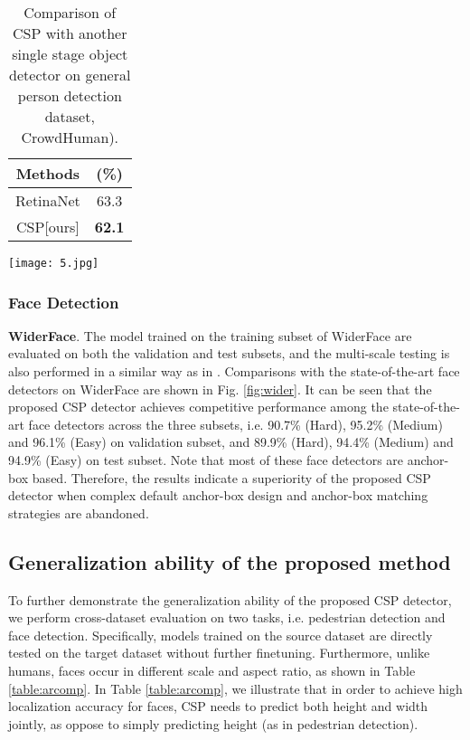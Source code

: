 \documentclass[review]{elsarticle}
\begin{document}
\begin{table}
\begin{center}
\begin{tabular}{c|c}
\hline
Methods & {(\%)}  \\
\hline
\hline
RetinaNet\cite{lin2017focal} & 63.3 \\
\hline
CSP[ours] & \textbf{62.1} \\
\hline
\end{tabular}
\end{center}
\caption{Comparison of CSP with another single stage object detector on general person detection dataset, CrowdHuman).}
\label{table:crowdhuman}
\end{table}

\begin{figure*}[t]
\begin{center}
\texttt{[image: 5.jpg]}
\end{center}
   \caption{Precision-recall curves on WIDER FACE validation and testing subsets.}
\label{fig:wider}
\end{figure*}

\subsubsection{Face Detection}
\textbf{WiderFace}.
The model trained on the training subset of WiderFace are evaluated on both the validation and test subsets, and the multi-scale testing is also performed in a similar way as in \cite{Tang_2018_ECCV}. Comparisons with the state-of-the-art face detectors on WiderFace are shown in Fig. \ref{fig:wider}. It can be seen that the proposed CSP detector achieves competitive performance among the state-of-the-art face detectors across the three subsets, i.e. 90.7\% (Hard), 95.2\% (Medium) and 96.1\% (Easy) on validation subset, and 89.9\% (Hard), 94.4\% (Medium) and 94.9\% (Easy) on test subset. Note that most of these face detectors are anchor-box based. Therefore, the results indicate a superiority of the proposed CSP detector when complex default anchor-box design and anchor-box matching strategies are abandoned.

\subsection{Generalization ability of the proposed method}
To further demonstrate the generalization ability of the proposed CSP detector, we perform cross-dataset evaluation on two tasks, i.e. pedestrian detection and face detection. Specifically, models trained on the source dataset are directly tested on the target dataset without further finetuning. Furthermore, unlike humans, faces occur in different scale and aspect ratio, as shown in Table \ref{table:arcomp}. In Table \ref{table:arcomp}, we illustrate that in order to achieve high localization accuracy for faces, CSP needs to predict both height and width jointly, as oppose to simply predicting height (as in pedestrian detection).
\end{document}

